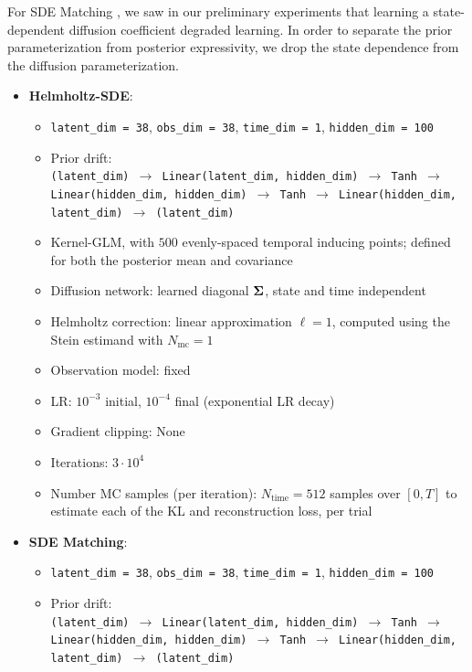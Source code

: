 For SDE Matching \cite{bartosh2025sde}, we saw in our preliminary experiments that learning a state-dependent diffusion coefficient degraded learning. 
In order to separate the prior parameterization from posterior expressivity, we drop the state dependence from the diffusion parameterization. 
\begin{itemize}
    \item \textbf{Helmholtz-SDE}:
    \begin{itemize}
        \item \texttt{latent\_dim = 38}, \texttt{obs\_dim = 38},  \texttt{time\_dim = 1}, \texttt{hidden\_dim = 100}
        \item 
        Prior drift:\\
        \texttt{(latent\_dim) $\to$ Linear(latent\_dim, hidden\_dim) $\to$ Tanh $\to$ Linear(hidden\_dim, hidden\_dim) $\to$ Tanh $\to$ Linear(hidden\_dim, latent\_dim) $\to$ (latent\_dim)}
        \item Kernel-GLM, with $500$ evenly-spaced temporal inducing points; defined for both the posterior mean and covariance
        \item Diffusion network: learned diagonal $\boldsymbol{\Sigma}$, state and time independent 
        \item Helmholtz correction: linear approximation $\ell = 1$, computed using the Stein estimand with $N_{\mathrm{mc}} = 1$
        \item Observation model: fixed
        \item LR: $10^{-3}$ initial, $10^{-4}$ final (exponential LR decay)
        \item Gradient clipping: None
        \item Iterations: $3 \cdot 10^4$
        \item Number MC samples (per iteration): $N_{\mathrm{time}} = 512$ samples over $[0, T]$ to estimate each of the KL and reconstruction loss, per trial
    \end{itemize}
    \item \textbf{SDE Matching}:
    \begin{itemize}
        \item \texttt{latent\_dim = 38}, \texttt{obs\_dim = 38},  \texttt{time\_dim = 1}, \texttt{hidden\_dim = 100}
        \item 
        Prior drift:\\
        \texttt{(latent\_dim) $\to$ Linear(latent\_dim, hidden\_dim) $\to$ Tanh $\to$ Linear(hidden\_dim, hidden\_dim) $\to$ Tanh $\to$ Linear(hidden\_dim, latent\_dim) $\to$ (latent\_dim)}

\end{itemize}
\end{itemize}
